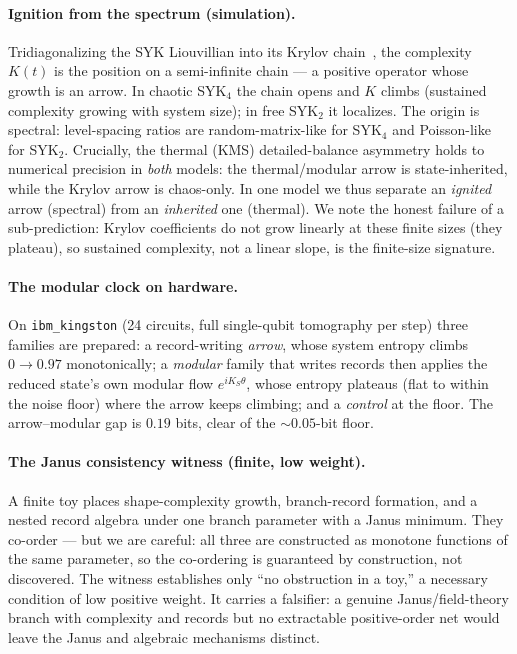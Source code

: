 \documentclass[11pt]{article}
\begin{document}
\paragraph{Ignition from the spectrum (simulation).} Tridiagonalizing the SYK
Liouvillian into its Krylov chain~\cite{parker}, the complexity $K(t)$ is the
position on a semi-infinite chain --- a positive operator whose growth is an
arrow. In chaotic SYK$_4$ the chain opens and $K$ climbs (sustained complexity
growing with system size); in free SYK$_2$ it localizes. The origin is spectral:
level-spacing ratios are random-matrix-like for SYK$_4$ and Poisson-like for
SYK$_2$. Crucially, the thermal (KMS) detailed-balance asymmetry holds to
numerical precision in
\emph{both} models: the thermal/modular arrow is state-inherited, while the
Krylov arrow is chaos-only. In one model we thus separate an \emph{ignited}
arrow (spectral) from an \emph{inherited} one (thermal). We note the honest
failure of a sub-prediction: Krylov coefficients do not grow linearly at these
finite sizes (they plateau), so sustained complexity, not a linear slope, is the
finite-size signature.

\paragraph{The modular clock on hardware.} On \texttt{ibm\_kingston} (24
circuits, full single-qubit tomography per step) three families are prepared: a
record-writing \emph{arrow}, whose system entropy climbs $0\to0.97$ monotonically;
a \emph{modular} family that writes records then applies the reduced state's own
modular flow $e^{iK_S\theta}$, whose entropy plateaus (flat to within the noise
floor) where the arrow keeps climbing; and a \emph{control} at the floor. The
arrow--modular gap is $0.19$ bits, clear of the $\sim0.05$-bit floor.

\paragraph{The Janus consistency witness (finite, low weight).} A finite toy
places shape-complexity growth, branch-record formation, and a nested record
algebra under one branch parameter with a Janus minimum. They co-order --- but we
are careful: all three are constructed as monotone functions of the same
parameter, so the co-ordering is guaranteed by construction, not discovered. The
witness establishes only ``no obstruction in a toy,'' a necessary condition of low
positive weight. It carries a falsifier: a genuine Janus/field-theory branch with
complexity and records but no extractable positive-order net would leave the
Janus and algebraic mechanisms distinct.
\end{document}
